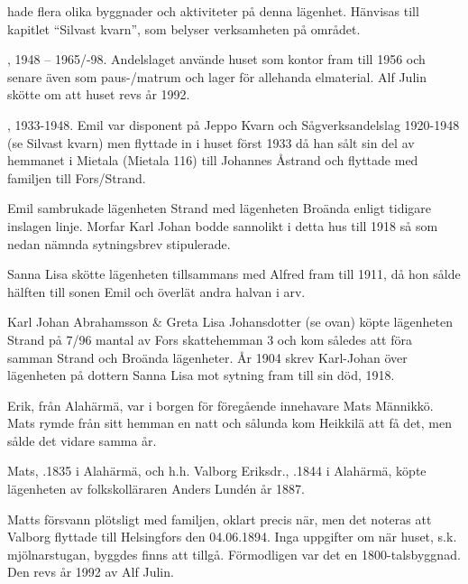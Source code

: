 

 hade flera olika byggnader och aktiviteter på denna lägenhet. Hänvisas till kapitlet ``Silvast kvarn'', som belyser verksamheten på området.


,
1948 – 1965/-98.
Andelslaget använde huset som kontor fram till 1956 och senare även som paus-/matrum och lager för allehanda elmaterial. Alf Julin skötte om att huset revs år 1992.


,
1933-1948.
Emil var disponent på Jeppo Kvarn och Sågverksandelslag 1920-1948 (se Silvast kvarn) men flyttade in i huset först 1933 då han sålt sin del av hemmanet i Mietala (Mietala 116) till Johannes Åstrand och flyttade med familjen till Fors/Strand.


Emil sambrukade lägenheten Strand med lägenheten Broända enligt tidigare inslagen linje. Morfar Karl Johan bodde sannolikt i detta hus till 1918 så som nedan nämnda sytningsbrev stipulerade.


Sanna Lisa skötte lägenheten tillsammans med Alfred fram till 1911,	då hon sålde hälften till sonen Emil och överlät andra halvan i arv.\jhvspace{}


Karl Johan Abrahamsson \& Greta Lisa Johansdotter (se ovan) köpte lägenheten Strand på 7/96 mantal av Fors skattehemman 3 och kom således att föra samman Strand och Broända lägenheter. År 1904 skrev Karl-Johan över lägenheten på dottern Sanna Lisa mot sytning fram till sin död, 1918.


Erik, från Alahärmä, var i borgen för föregående innehavare Mats Männikkö. Mats rymde från sitt hemman en natt och sålunda kom Heikkilä att få det, men sålde det vidare samma år.


Mats, .1835 i Alahärmä, och h.h. Valborg Eriksdr., .1844 i Alahärmä, köpte lägenheten av folkskolläraren Anders Lundén år 1887.
\begin{jhchildren}
  \item {}
  \item {}
  \item {}
  \item {}
  \item {}
\end{jhchildren}
Matts försvann plötsligt med familjen, oklart precis när, men det noteras att Valborg flyttade till Helsingfors den 04.06.1894. Inga uppgifter om när huset, s.k. mjölnarstugan, byggdes finns att tillgå. Förmodligen var det en 1800-talsbyggnad. Den revs år 1992 av Alf Julin.


